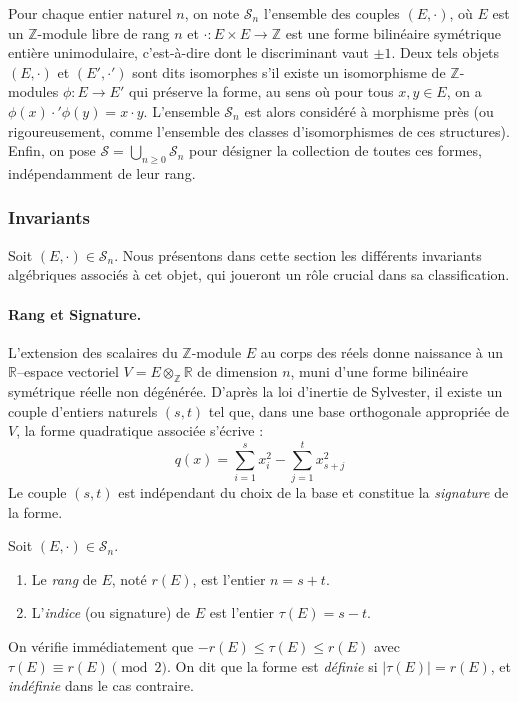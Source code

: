 Pour chaque entier naturel $n$, on note $\mathcal{S}_n$ l'ensemble des couples $(E, \cdot)$, où $E$ est un $\mathbb{Z}$-module libre de rang $n$ et $\cdot : E \times E \to \mathbb{Z}$ est une forme bilinéaire symétrique entière unimodulaire, c'est-à-dire dont le discriminant vaut $\pm 1$. Deux tels objets $(E, \cdot)$ et $(E', \cdot')$ sont dits isomorphes s'il existe un isomorphisme de $\mathbb{Z}$-modules $\phi : E \to E'$ qui préserve la forme, au sens où pour tous $x, y \in E$, on a $\phi(x) \cdot' \phi(y) = x \cdot y$. L'ensemble $\mathcal{S}_n$ est alors considéré à morphisme près (ou rigoureusement, comme l'ensemble des classes d'isomorphismes de ces structures). Enfin, on pose $\mathcal{S} = \bigcup_{n \geq 0} \mathcal{S}_n$ pour désigner la collection de toutes ces formes, indépendamment de leur rang.

\medskip


\subsubsection{Invariants}

Soit $(E, \cdot) \in \mathcal{S}_n$. Nous présentons dans cette section les différents invariants algébriques associés à cet objet, qui joueront un rôle crucial dans sa classification.

\paragraph{Rang et Signature.}
L'extension des scalaires du $\mathbb{Z}$-module $E$ au corps des réels donne naissance à un $\mathbb{R}$–espace vectoriel $V = E \otimes_{\mathbb{Z}} \mathbb{R}$ de dimension $n$, muni d'une forme bilinéaire symétrique réelle non dégénérée. D'après la loi d'inertie de Sylvester, il existe un couple d'entiers naturels $(s, t)$ tel que, dans une base orthogonale appropriée de $V$, la forme quadratique associée s'écrive :
\[
q(x) = \sum_{i=1}^{s} x_i^2 - \sum_{j=1}^{t} x_{s+j}^2
\]
Le couple $(s, t)$ est indépendant du choix de la base et constitue la \emph{signature} de la forme.

\begin{definition}
Soit $(E, \cdot) \in \mathcal{S}_n$. 
\begin{enumerate}
    \item Le \emph{rang} de $E$, noté $r(E)$, est l'entier $n = s + t$.
    \item L'\emph{indice} (ou signature) de $E$ est l'entier $\tau(E) = s - t$.
\end{enumerate}
On vérifie immédiatement que $-r(E) \leq \tau(E) \leq r(E)$ avec $\tau(E) \equiv r(E) \pmod{2}$. On dit que la forme est \emph{définie} si $|\tau(E)| = r(E)$, et \emph{indéfinie} dans le cas contraire.
\end{definition}

